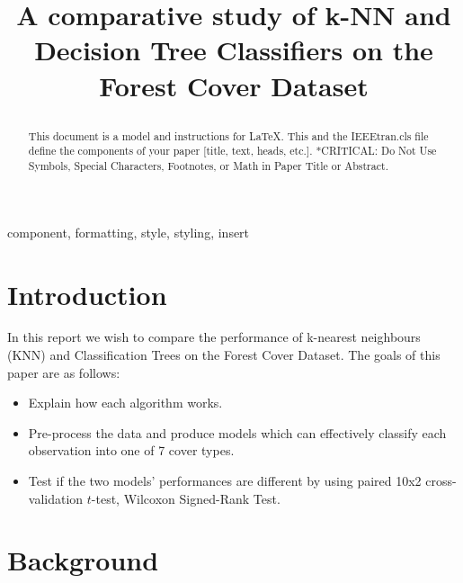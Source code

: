 \documentclass[conference]{IEEEtran}
\begin{document}
\title{A comparative study of k-NN and Decision Tree Classifiers on the Forest Cover Dataset\\
{\footnotesize}

}

\author{
}


\maketitle

\begin{abstract}
This document is a model and instructions for \LaTeX.
This and the IEEEtran.cls file define the components of your paper [title, text, heads, etc.]. *CRITICAL: Do Not Use Symbols, Special Characters, Footnotes, 
or Math in Paper Title or Abstract.
\end{abstract}

\begin{IEEEkeywords}
component, formatting, style, styling, insert
\end{IEEEkeywords}

\section{Introduction}


In this report we wish to compare the performance of k-nearest neighbours (KNN) and Classification Trees on the Forest Cover Dataset. The goals of this paper are as follows:
\begin{itemize}
	\item Explain how each algorithm works.
	\item Pre-process the data and produce models which can effectively classify each observation into one of 7 cover types.
	\item Test if the two models' performances are different by using paired 10x2 cross-validation $t$-test, Wilcoxon Signed-Rank Test.
\end{itemize}

\section{Background}
\end{document}
